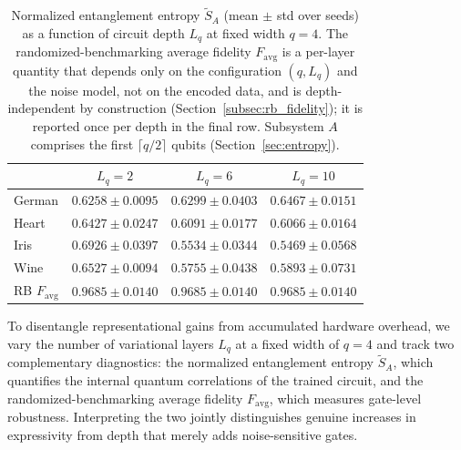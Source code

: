 \documentclass[11pt,a4paper]{article}
\begin{document}
\begin{table}[H]
  \centering
  \caption{Normalized entanglement entropy $\widetilde{S}_A$ (mean $\pm$
  std over seeds) as a function of circuit depth $L_q$ at fixed width
  $q=4$. The randomized-benchmarking average fidelity
  $F_{\mathrm{avg}}$ is a per-layer quantity that depends only on the
  configuration $(q, L_q)$ and the noise model, not on the encoded data,
  and is depth-independent by construction
  (Section~\ref{subsec:rb_fidelity}); it is reported once per depth in
  the final row. Subsystem $A$ comprises the first $\lceil q/2\rceil$
  qubits (Section~\ref{sec:entropy}).}
  \label{tab:entropy_rb_depth}
  \small
  \begin{tabular}{l ccc}
    \toprule
    & $L_q=2$ & $L_q=6$ & $L_q=10$ \\
    \midrule
    German & $0.6258 \pm 0.0095$ & $0.6299 \pm 0.0403$ & $0.6467 \pm 0.0151$ \\
    Heart  & $0.6427 \pm 0.0247$ & $0.6091 \pm 0.0177$ & $0.6066 \pm 0.0164$ \\
    Iris   & $0.6926 \pm 0.0397$ & $0.5534 \pm 0.0344$ & $0.5469 \pm 0.0568$ \\
    Wine   & $0.6527 \pm 0.0094$ & $0.5755 \pm 0.0438$ & $0.5893 \pm 0.0731$ \\
    \midrule
    RB $F_{\mathrm{avg}}$ & $0.9685 \pm 0.0140$ & $0.9685 \pm 0.0140$ & $0.9685 \pm 0.0140$ \\
    \bottomrule
  \end{tabular}
\end{table}

To disentangle representational gains from accumulated hardware overhead, we vary the number of variational layers $L_q$ at a fixed width of $q=4$ and track two complementary diagnostics: the normalized entanglement entropy $\widetilde{S}_A$, which quantifies the internal quantum correlations of the trained circuit, and the randomized-benchmarking average fidelity $F_{\mathrm{avg}}$, which measures gate-level robustness. Interpreting the two jointly distinguishes genuine increases in expressivity from depth that merely adds noise-sensitive gates.
\end{document}
